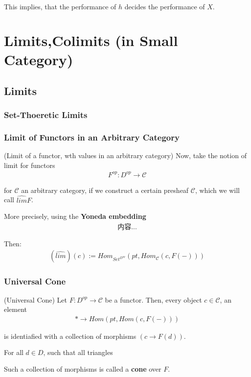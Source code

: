\documentclass[Total.tex]{subfiles}
\begin{document}
					This implies, that the performance of $h$ decides the performance of $X$.
			\section{Limits,Colimits (in Small Category)}
			\subsection{Limits}
			\subsubsection{Set-Thoeretic Limits}
			\subsubsection{Limit of Functors in an Arbitrary Category}
			
			\begin{Def}
				(Limit of a functor, wth values in an arbitrary category) Now,  take the notion of limit for functors
				\begin{gather*}
					F^{op}:D^{op}\rightarrow \mathcal{C}
				\end{gather*}
				
				for $\mathcal{C}$ an arbitrary category, if we construct a certain presheaf $\mathcal{C}$, which we will call $\hat{lim}F$.
				
				More precisely, using the \textbf{Yoneda embedding}
				\begin{gather*}
					内容...
				\end{gather*}
				
				Then:
				\begin{gather*}
					(\hat{lim})(c):=Hom_{Set^{D^{op}}}(pt,Hom_\mathcal{C}(c,F(-)))
				\end{gather*}
			\end{Def}
			
			\subsubsection{Universal Cone}
			\begin{Def}
				(Universal Cone) Let $F:D^{op}\rightarrow \mathcal{C}$ be a functor. Then, every object $c\in \mathcal{C}$, an element
				\begin{gather*}
					*\rightarrow Hom(pt,Hom(c,F(-)))
				\end{gather*}
				
				is identiafied with a collection of morphisms $(c\rightarrow F(d))$.
				
				For all $d\in D$, such that all triangles
				\begin{center}
				\end{center}
				
				Such a collection of morphisms is called a \textbf{cone} over $F$.
			\end{Def}
\end{document}
